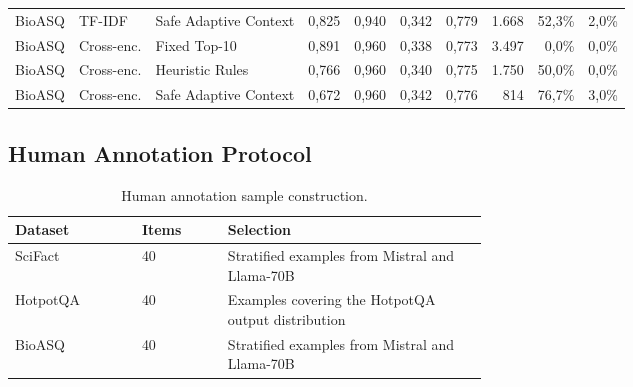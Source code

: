 \documentclass[11pt]{article}
\begin{document}
\begin{table}[H]
{\begin{tabular}{lllrrrrrrr}
BioASQ & TF-IDF & Safe Adaptive Context & 0,825 & 0,940 & 0,342 & 0,779 & 1.668 & 52,3\% & 2,0\% \\
BioASQ & Cross-enc. & Fixed Top-10 & 0,891 & 0,960 & 0,338 & 0,773 & 3.497 & 0,0\% & 0,0\% \\
BioASQ & Cross-enc. & Heuristic Rules & 0,766 & 0,960 & 0,340 & 0,775 & 1.750 & 50,0\% & 0,0\% \\
BioASQ & Cross-enc. & Safe Adaptive Context & 0,672 & 0,960 & 0,342 & 0,776 & 814 & 76,7\% & 3,0\% \\
\bottomrule
\end{tabular}%
}
\end{table}


\subsection{Human Annotation Protocol}
\label{app:annotation-protocol}
\begin{table}[H]
\centering
\small
\caption{Human annotation label definitions.}
\label{tab:annotation_labels}
\end{table}


\begin{table}[H]
\centering
\small
\caption{Human annotation sample construction.}
\label{tab:annotation_sample}
\begin{tabular}{llp{0.55\linewidth}}
\toprule
Dataset & Items & Selection \\
\midrule
SciFact & 40 & Stratified examples from Mistral and Llama-70B \\
HotpotQA & 40 & Examples covering the HotpotQA output distribution \\
BioASQ & 40 & Stratified examples from Mistral and Llama-70B \\
\bottomrule
\end{tabular}
\end{table}
\end{document}
